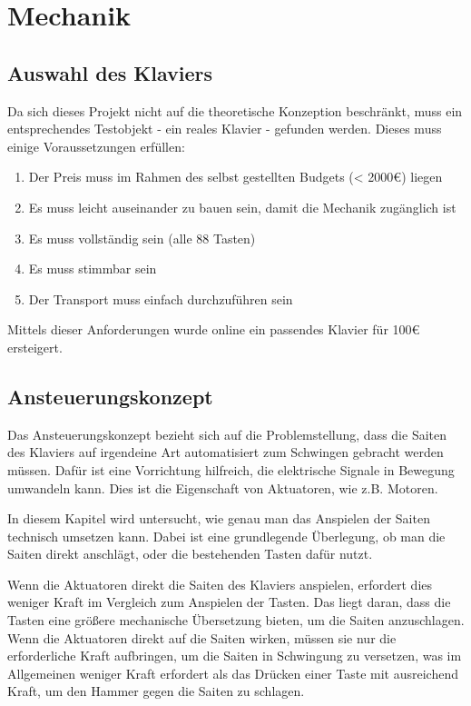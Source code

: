 \section{Mechanik}\label{konzeptionHW-mechanik}

\subsection{Auswahl des Klaviers}


Da sich dieses Projekt nicht auf die theoretische Konzeption beschränkt, muss ein entsprechendes Testobjekt - ein reales Klavier - gefunden werden.
Dieses muss einige Voraussetzungen erfüllen:
\begin{enumerate}
	\item 	Der Preis muss im Rahmen des selbst gestellten Budgets (< 2000\euro{}) liegen
	\item 	Es muss leicht auseinander zu bauen sein, damit die Mechanik zugänglich ist
	\item 	Es muss vollständig sein (alle 88 Tasten)
	\item 	Es muss stimmbar sein
	\item 	Der Transport muss einfach durchzuführen sein
\end{enumerate}

Mittels dieser Anforderungen wurde online ein passendes Klavier für 100\euro{} ersteigert.

\subsection{Ansteuerungskonzept} \label{subsec:konzeptionhw-ansteuerungskonzept}


Das Ansteuerungskonzept bezieht sich auf die Problemstellung, dass die Saiten des Klaviers auf irgendeine Art automatisiert zum Schwingen gebracht werden müssen.
Dafür ist eine Vorrichtung hilfreich, die elektrische Signale in Bewegung umwandeln kann.
Dies ist die Eigenschaft von Aktuatoren, wie z.B. Motoren.

In diesem Kapitel wird untersucht, wie genau man das Anspielen der Saiten technisch umsetzen kann.
Dabei ist eine grundlegende Überlegung, ob man die Saiten direkt anschlägt,
oder die bestehenden Tasten dafür nutzt.

Wenn die Aktuatoren direkt die Saiten des Klaviers anspielen, erfordert dies weniger Kraft im Vergleich zum
Anspielen der Tasten. Das liegt daran, dass die Tasten eine größere mechanische Übersetzung bieten, um die Saiten
anzuschlagen. Wenn die Aktuatoren direkt auf die Saiten wirken, müssen sie nur die erforderliche Kraft aufbringen, um
die Saiten in Schwingung zu versetzen, was im Allgemeinen weniger Kraft erfordert als das Drücken einer Taste mit
ausreichend Kraft, um den Hammer gegen die Saiten zu schlagen.

